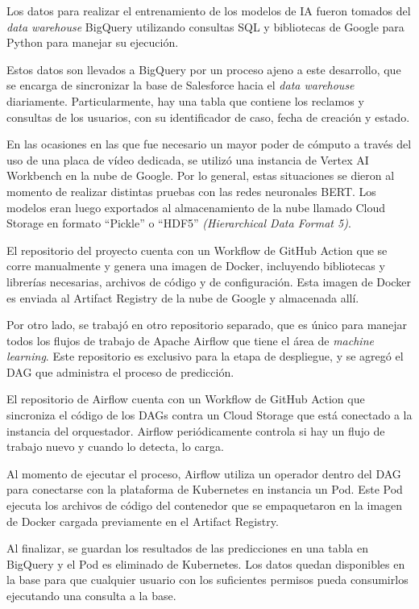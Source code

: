 Los datos para realizar el entrenamiento de los modelos de IA fueron tomados del \textit{data warehouse} BigQuery utilizando consultas SQL y bibliotecas de Google para Python para manejar su ejecución.

Estos datos son llevados a BigQuery por un proceso ajeno a este desarrollo, que se encarga de sincronizar la base de Salesforce hacia el \textit{data warehouse} diariamente. Particularmente, hay una tabla que contiene los reclamos y consultas de los usuarios, con su identificador de caso, fecha de creación y estado.

En las ocasiones en las que fue necesario un mayor poder de cómputo a través del uso de una placa de vídeo dedicada, se utilizó una instancia de Vertex AI Workbench en la nube de Google. Por lo general, estas situaciones se dieron al momento de realizar distintas pruebas con las redes neuronales BERT. Los modelos eran luego exportados al almacenamiento de la nube llamado Cloud Storage en formato ``Pickle'' o ``HDF5'' \textit{(Hierarchical Data Format 5)}.

El repositorio del proyecto cuenta con un Workflow de GitHub Action que se corre manualmente y genera una imagen de Docker, incluyendo bibliotecas y librerías necesarias, archivos de código y de configuración. Esta imagen de Docker es enviada al Artifact Registry de la nube de Google y almacenada allí.

Por otro lado, se trabajó en otro repositorio separado, que es único para manejar todos los flujos de trabajo de Apache Airflow que tiene el área de \textit{machine learning}. Este repositorio es exclusivo para la etapa de despliegue, y se agregó el DAG que administra el proceso de predicción.

El repositorio de Airflow cuenta con un Workflow de GitHub Action que sincroniza el código de los DAGs contra un Cloud Storage que está conectado a la instancia del orquestador. Airflow periódicamente controla si hay un flujo de trabajo nuevo y cuando lo detecta, lo carga.

Al momento de ejecutar el proceso, Airflow utiliza un operador dentro del DAG para conectarse con la plataforma de Kubernetes en instancia un Pod. Este Pod ejecuta los archivos de código del contenedor que se empaquetaron en la imagen de Docker cargada previamente en el Artifact Registry.

Al finalizar, se guardan los resultados de las predicciones en una tabla en BigQuery y el Pod es eliminado de Kubernetes. Los datos quedan disponibles en la base para que cualquier usuario con los suficientes permisos pueda consumirlos ejecutando una consulta a la base.

